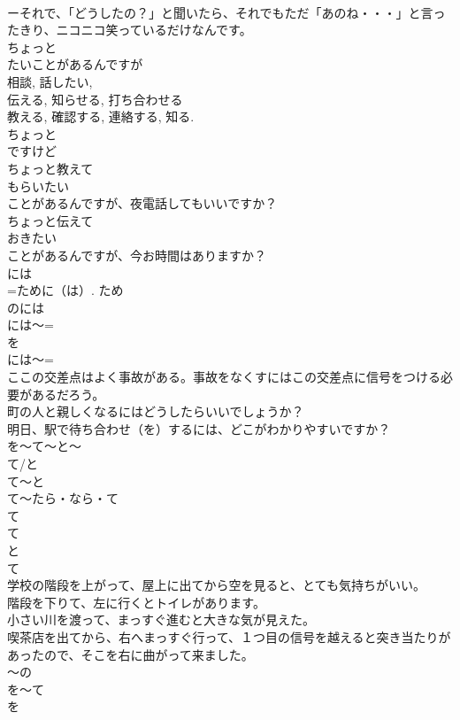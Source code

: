 \documentclass[8pt]{extreport}
\begin{document}
\begin{CJK}{UTF8}{min}
\\	ーそれで、「どうしたの？」と聞いたら、それでもただ「あのね・・・」と言ったきり、ニコニコ笑っているだけなんです。
\\	ちょっと
\\	たいことがあるんですが
\\	相談, 話したい, 
\\	伝える, 知らせる, 打ち合わせる 
\\	教える, 確認する, 連絡する, 知る.
\\	ちょっと
\\	ですけど 
\\	ちょっと教えて
\\	もらいたい
\\	ことがあるんですが、夜電話してもいいですか？
\\	ちょっと伝えて
\\	おきたい
\\	ことがあるんですが、今お時間はありますか？
\\	には
\\	=ために（は）. ため 
\\	のには
\\	には～=
\\	を
\\	には～=
\\	ここの交差点はよく事故がある。事故をなくすにはこの交差点に信号をつける必要があるだろう。
\\	町の人と親しくなるにはどうしたらいいでしょうか？
\\	明日、駅で待ち合わせ（を）するには、どこがわかりやすいですか？	
\\	を～て～と～
\\	て/と 
\\	て～と
\\	て～たら・なら・て
\\	て
\\	て
\\	と
\\	て
\\	学校の階段を上がって、屋上に出てから空を見ると、とても気持ちがいい。
\\	階段を下りて、左に行くとトイレがあります。
\\	小さい川を渡って、まっすぐ進むと大きな気が見えた。
\\	喫茶店を出てから、右へまっすぐ行って、１つ目の信号を越えると突き当たりがあったので、そこを右に曲がって来ました。
\\	～の
\\	を～て
\\	を

\end{CJK}
\end{document}
